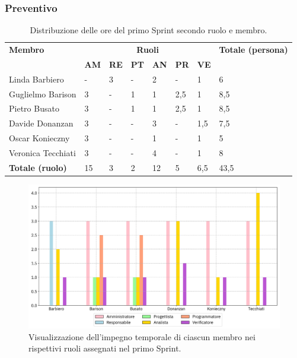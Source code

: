 \subsubsection{Preventivo}
\begin{table}[ht!]
	\centering
	\begin{tabular}{p{4cm} p{1cm} p{1cm} p{1cm} p{1cm} p{1cm} p{1cm} p{3cm}}
		\toprule
        \textbf{Membro} & \multicolumn{6}{c}{\textbf{Ruoli}} & \textbf{Totale (persona)}\\
		& \textbf{AM} & \textbf{RE} & \textbf{PT} & \textbf{AN} & \textbf{PR} & \textbf{VE}\\
		\midrule
        Linda Barbiero          & -     & 3     & -     & 2     & -     & 1     & 6 \\
        Guglielmo Barison       & 3     & -     & 1     & 1     & 2,5   & 1     & 8,5\\
        Pietro Busato           & 3     & -     & 1     & 1     & 2,5   & 1     & 8,5 \\
        Davide Donanzan         & 3     & -     & -     & 3     & -     & 1,5   & 7,5 \\
        Oscar Konieczny         & 3     & -     & -     & 1     & -     & 1     & 5 \\
        Veronica Tecchiati      & 3     & -     & -     & 4     & -     & 1     & 8 \\
        \bottomrule
        \textbf{Totale (ruolo)} & 15     & 3     & 2     & 12   & 5     & 6,5   & 43,5 \\
	\end{tabular}
	\caption{Distribuzione delle ore del primo Sprint secondo ruolo e membro.}
	\label{table:Distribuzione delle ore del primo Sprint secondo ruolo e membro}
\end{table}
\begin{figure}[ht!]
    \centering
    \includegraphics[width=15cm]{./asset/istogramma_periodo_1.png}
    \caption{Visualizzazione dell’impegno temporale di ciascun membro nei rispettivi ruoli assegnati
    nel primo Sprint.}
    \label{figure:Visualizzazione dell’impegno temporale di ciascun membro nei rispettivi ruoli
    assegnati nel primo Sprint}
\end{figure}
